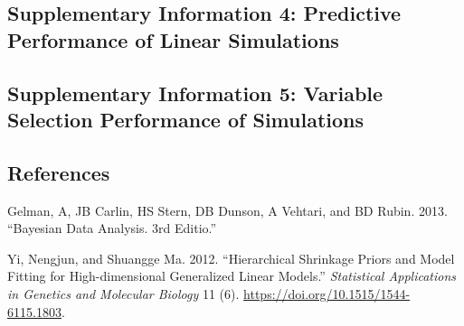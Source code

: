 \documentclass[
]{article}
\newlength{\cslhangindent}
\newlength{\cslentryspacingunit} %
\newenvironment{CSLReferences}[2] %
 {%
  \setlength{\parindent}{0pt}
  \ifodd #1
  \let\oldpar\par
  \def\par{\hangindent=\cslhangindent\oldpar}
  \fi
  \setlength{\parskip}{#2\cslentryspacingunit}
 }%
 {}
\begin{document}
\clearpage

\subsection{Supplementary Information 4: Predictive Performance of Linear Simulations}



\clearpage

\subsection{Supplementary Information 5: Variable Selection Performance of Simulations}




\clearpage
\subsection{References}

\hypertarget{refs}{}
\begin{CSLReferences}{1}{0}
\leavevmode{}%
Gelman, A, JB Carlin, HS Stern, DB Dunson, A Vehtari, and BD Rubin.
2013. {``Bayesian Data Analysis. 3rd Editio.''}

\leavevmode{}%
Yi, Nengjun, and Shuangge Ma. 2012. {``{Hierarchical Shrinkage Priors
and Model Fitting for High-dimensional Generalized Linear Models}.''}
\emph{Statistical Applications in Genetics and Molecular Biology} 11
(6). \url{https://doi.org/10.1515/1544-6115.1803}.

\end{CSLReferences}
\end{document}
